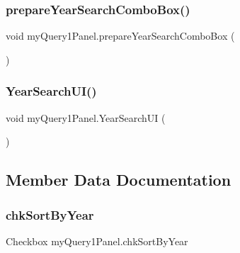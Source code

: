 \hypertarget{classmy_query1_panel_a31942385ff8324fbe1220229037b2cf6}{}\label{classmy_query1_panel_a31942385ff8324fbe1220229037b2cf6} 
\subsubsection{\texorpdfstring{prepare\+Year\+Search\+Combo\+Box()}{prepareYearSearchComboBox()}}
{\footnotesize\ttfamily void my\+Query1\+Panel.\+prepare\+Year\+Search\+Combo\+Box (\begin{DoxyParamCaption}{ }\end{DoxyParamCaption})\hspace{0.3cm}{\ttfamily [private]}}

\hypertarget{classmy_query1_panel_a1d028e5e8a80ea2a14956e7facfe3ce3}{}\label{classmy_query1_panel_a1d028e5e8a80ea2a14956e7facfe3ce3} 
\subsubsection{\texorpdfstring{Year\+Search\+U\+I()}{YearSearchUI()}}
{\footnotesize\ttfamily void my\+Query1\+Panel.\+Year\+Search\+UI (\begin{DoxyParamCaption}{ }\end{DoxyParamCaption})\hspace{0.3cm}{\ttfamily [private]}}



\subsection{Member Data Documentation}
\hypertarget{classmy_query1_panel_a112a1c15d47ccd9a16a3d5d4e7211809}{}\label{classmy_query1_panel_a112a1c15d47ccd9a16a3d5d4e7211809} 
\subsubsection{\texorpdfstring{chk\+Sort\+By\+Year}{chkSortByYear}}
{\footnotesize\ttfamily Checkbox my\+Query1\+Panel.\+chk\+Sort\+By\+Year\hspace{0.3cm}{\ttfamily [protected]}}

